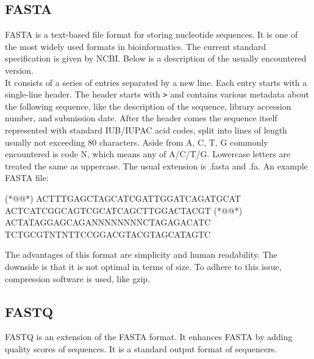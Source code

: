 \subsection{FASTA}

FASTA is a text-based file format for storing nucleotide sequences. It is one of the most widely used formats in bioinformatics. The current standard specification is given by NCBI. Below is a description of the usually encountered version. \\

\noindent It consists of a series of entries separated by a new line. Each entry starts with a single-line header. The header starts with \texttt{>} and contains various metadata about the following sequence, like the description of the sequence, library accession number, and submission date. After the header comes the sequence itself represented with standard IUB/IUPAC acid codes, split into lines of length usually not exceeding $80$ characters. Aside from A, C, T, G commonly encountered is code N, which means any of A/C/T/G. Lowercase letters are treated the same as uppercase. The usual extension is .fasta and .fa. An example FASTA file:

\begin{FastxFile}[fasta]
(*@@*)
ACTTTGAGCTAGCATCGATTGGATCAGATGCAT
ACTCATCGGCAGTCGCATCAGCTTGGACTACGT
(*@@*)
ACTATAGGAGCAGANNNNNNNNCTAGAGACATC
TCTGCGTNTNTTCCGGACGTACGTAGCATAGTC
\end{FastxFile}

\noindent The advantages of this format are simplicity and human readability. The downside is that it is not optimal in terms of size. To adhere to this issue, compression software is used, like gzip.


\subsection{FASTQ}

FASTQ is an extension of the FASTA format. It enhances FASTA by adding quality scores of sequences. It is a standard output format of sequencers. \\

